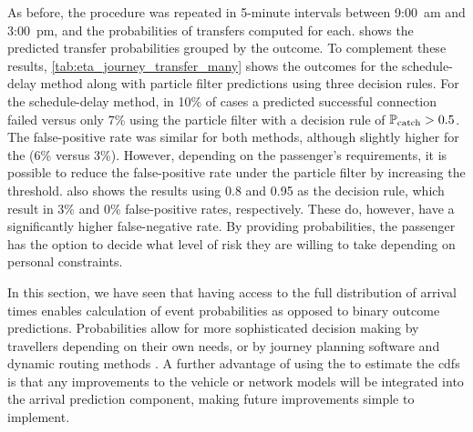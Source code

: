 As before, the procedure was repeated in 5-minute intervals between  9:00~am and  3:00~pm, and the probabilities of transfers computed for each.  shows the predicted transfer probabilities grouped by the outcome. To complement these results, \cref{tab:eta_journey_transfer_many} shows the outcomes for the schedule-delay method along with particle filter predictions using three decision rules. For the schedule-delay method, in 10\% of cases a predicted successful connection failed versus only 7\% using the particle filter with a decision rule of $\mathbb{P}_\text{catch} > 0.5$. The false-positive rate was similar for both methods, although slightly higher for the \pf{} (6\% versus 3\%). However, depending on the passenger's requirements, it is possible to reduce the false-positive rate under the particle filter by increasing the threshold.    also shows the results using 0.8 and 0.95 as the decision rule, which result in 3\% and 0\% false-positive rates, respectively. These do, however, have a significantly higher false-negative rate. By providing probabilities, the passenger has the option to decide what level of risk they are willing to take depending on personal constraints.


In this section, we have seen that having access to the full distribution of arrival times enables calculation of event probabilities as opposed to binary outcome predictions. Probabilities allow for more sophisticated decision making by travellers depending on their own needs, or by journey planning software and dynamic routing methods \citep{Berczi_2017}. A further advantage of using the \pf{} to estimate the \glspl{cdf} is that any improvements to the vehicle or network models will be integrated into the arrival prediction component, making future improvements simple to implement.
